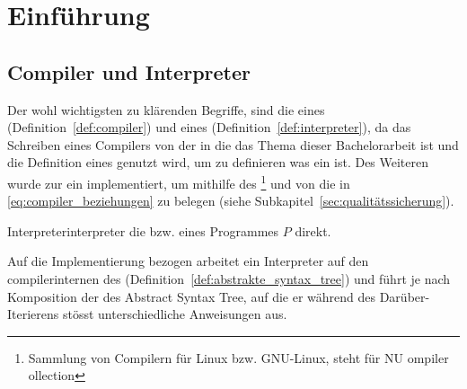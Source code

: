 \chapter{Einführung}
\label{ch:einführung}

\section{Compiler und Interpreter}
Der wohl wichtigsten zu klärenden Begriffe, sind die eines  (Definition~\ref{def:compiler}) und eines   (Definition~\ref{def:interpreter}), da das Schreiben eines Compilers von der  in die  das Thema dieser Bachelorarbeit ist und die Definition eines  genutzt wird, um zu definieren was ein  ist. Des Weiteren wurde zur  ein  implementiert, um mithilfe des \footnote{Sammlung von Compilern für Linux bzw. GNU-Linux, steht für NU ompiler ollection} und von  die  in \ref{eq:compiler_beziehungen} zu belegen (siehe Subkapitel~\ref{sec:qualitätssicherung}).

\begin{Definition}{Interpreter}{interpreter}
   die  bzw.  eines Programmes $P$ direkt.

  Auf die Implementierung bezogen arbeitet ein Interpreter auf den compilerinternen  des  (Definition~\ref{def:abstrakte_syntax_tree}) und führt je nach Komposition der  des Abstract Syntax Tree, auf die er während des Darüber-Iterierens stösst unterschiedliche Anweisungen aus.
\end{Definition}

